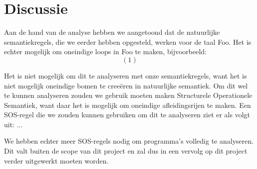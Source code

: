 \documentclass[11pt]{article}
\begin{document}
\section{Discussie}
Aan de hand van de analyse hebben we aangetoond dat de natuurlijke semantiekregels, die we eerder hebben opgesteld, werken voor de taal Foo. 
Het is echter mogelijk om oneindige loops in Foo te maken, bijvoorbeeld:
\[(1)\]

Het is niet mogelijk om dit te analyseren met onze semantiekregels, want het is niet mogelijk oneindige bomen te creeëren in natuurlijke semantiek. 
Om dit wel te kunnen analyseren zouden we gebruik moeten maken Structurele Operationele Semantiek, want daar het is mogelijk om oneindige afleidingsrijen te maken. 
Een SOS-regel die we zouden kunnen gebruiken om dit te analyseren ziet er als volgt uit: ...

We hebben echter meer SOS-regels nodig om programma's volledig te analyseren. Dit valt buiten de scope van dit project en zal dus in een vervolg op dit project verder uitgewerkt moeten worden.

%
\end{document}
